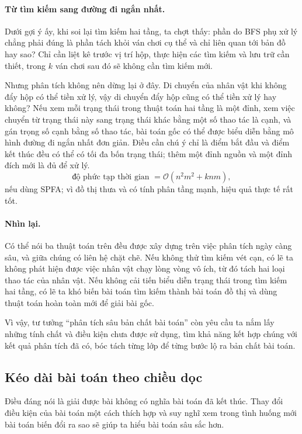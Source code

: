 \documentclass[11pt]{article}
\newcommand{\Oh}{\mathcal{O}}
\begin{document}
\paragraph{Từ tìm kiếm sang đường đi ngắn nhất.}
Dưới gợi ý ấy, khi soi lại tìm kiếm hai tầng, ta chợt thấy: phần do BFS phụ
xử lý chẳng phải đúng là phần tách khỏi ván chơi cụ thể và chỉ liên quan tới
bản đồ hay sao? Chỉ cần liệt kê trước vị trí hộp, thực hiện các tìm kiếm và
lưu trữ cần thiết, trong \(k\) ván chơi sau đó sẽ không cần tìm kiếm mới.

Nhưng phân tích không nên dừng lại ở đây. Di chuyển của nhân vật khi không đẩy
hộp có thể tiền xử lý, vậy di chuyển đẩy hộp cũng có thể tiền xử lý hay không?
Nếu xem mỗi trạng thái trong thuật toán hai tầng là một đỉnh, xem việc chuyển
từ trạng thái này sang trạng thái khác bằng một số thao tác là cạnh, và gán
trọng số cạnh bằng số thao tác, bài toán gốc có thể được biểu diễn bằng mô
hình đường đi ngắn nhất đơn giản. Điều cần chú ý chỉ là điểm bắt đầu và điểm
kết thúc đều có thể có tối đa bốn trạng thái; thêm một đỉnh nguồn và một đỉnh
đích mới là đủ để xử lý.
\[
  \text{độ phức tạp thời gian }=\Oh(n^2m^2+knm),
\]
nếu dùng SPFA; vì đồ thị thưa và có tính phân tầng mạnh, hiệu quả thực tế rất
tốt.

\paragraph{Nhìn lại.}
Có thể nói ba thuật toán trên đều được xây dựng trên việc phân tích ngày càng
sâu, và giữa chúng có liên hệ chặt chẽ. Nếu không thử tìm kiếm vét cạn, có lẽ
ta không phát hiện được việc nhân vật chạy lòng vòng vô ích, từ đó tách hai
loại thao tác của nhân vật. Nếu không cải tiến biểu diễn trạng thái trong tìm
kiếm hai tầng, có lẽ ta khó biến bài toán tìm kiếm thành bài toán đồ thị và
dùng thuật toán hoàn toàn mới để giải bài gốc.

Vì vậy, tư tưởng ``phân tích sâu bản chất bài toán'' còn yêu cầu ta nắm lấy
những tính chất và điều kiện chưa được sử dụng, tìm khả năng kết hợp chúng với
kết quả phân tích đã có, bóc tách từng lớp để từng bước lộ ra bản chất bài
toán.

\subsection{Kéo dài bài toán theo chiều dọc}

Điều đáng nói là giải được bài không có nghĩa bài toán đã kết thúc. Thay đổi
điều kiện của bài toán một cách thích hợp và suy nghĩ xem trong tình huống mới
bài toán biến đổi ra sao sẽ giúp ta hiểu bài toán sâu sắc hơn.
\end{document}
